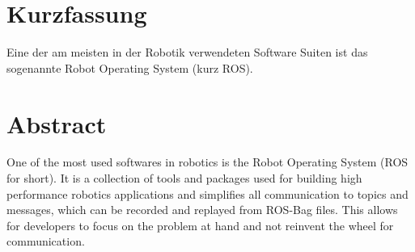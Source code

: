 \chapter{Kurzfassung}

\vspace{10mm}

Eine der am meisten in der Robotik verwendeten Software Suiten ist das sogenannte Robot Operating System (kurz ROS).


\chapter{Abstract}

\vspace{10mm}

One of the most used softwares in robotics is the Robot Operating System (ROS for short).
It is a collection of tools and packages used for building high performance robotics applications and
simplifies all communication to topics and messages, which can be recorded and replayed from ROS-Bag files.
This allows for developers to focus on the problem at hand and not reinvent the wheel for communication.

